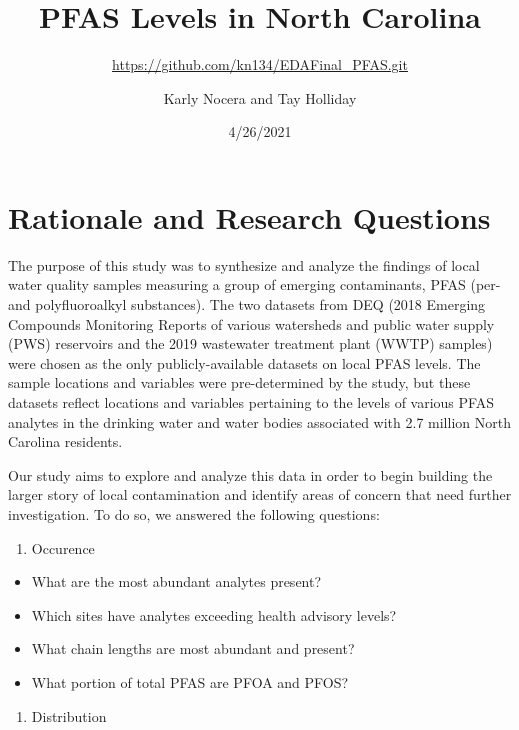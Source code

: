 \documentclass[
  12pt,
]{article}
\title{PFAS Levels in North Carolina}
\subtitle{\url{https://github.com/kn134/EDAFinal_PFAS.git}}
\author{Karly Nocera and Tay Holliday}
\date{4/26/2021}
\providecommand{\tightlist}{%
  \setlength{\itemsep}{0pt}\setlength{\parskip}{0pt}}
\begin{document}
\maketitle

\newpage
\tableofcontents 
\newpage
\listoftables 
\newpage
\listoffigures 
\newpage

\hypertarget{rationale-and-research-questions}{%
\section{Rationale and Research
Questions}\label{rationale-and-research-questions}}

The purpose of this study was to synthesize and analyze the findings of
local water quality samples measuring a group of emerging contaminants,
PFAS (per- and polyfluoroalkyl substances). The two datasets from DEQ
(2018 Emerging Compounds Monitoring Reports of various watersheds and
public water supply (PWS) reservoirs and the 2019 wastewater treatment
plant (WWTP) samples) were chosen as the only publicly-available
datasets on local PFAS levels. The sample locations and variables were
pre-determined by the study, but these datasets reflect locations and
variables pertaining to the levels of various PFAS analytes in the
drinking water and water bodies associated with 2.7 million North
Carolina residents.

Our study aims to explore and analyze this data in order to begin
building the larger story of local contamination and identify areas of
concern that need further investigation. To do so, we answered the
following questions:

\begin{enumerate}
\def\labelenumi{\arabic{enumi}.}
\tightlist
\item
  Occurence
\end{enumerate}

\begin{itemize}
\tightlist
\item
  What are the most abundant analytes present?
\item
  Which sites have analytes exceeding health advisory levels?
\item
  What chain lengths are most abundant and present?
\item
  What portion of total PFAS are PFOA and PFOS?
\end{itemize}

\begin{enumerate}
\def\labelenumi{\arabic{enumi}.}
\setcounter{enumi}{1}
\tightlist
\item
  Distribution
\end{enumerate}
\end{document}
